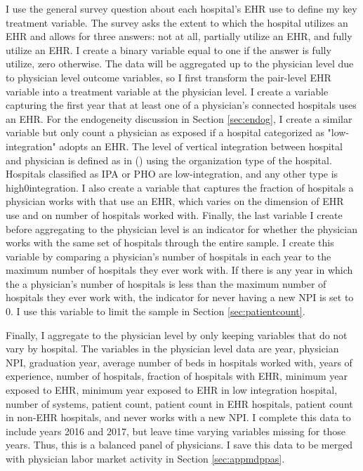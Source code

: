 \documentclass[12pt]{article}
\begin{document}
I use the general survey question about each hospital's EHR use to define my key treatment variable. The survey asks the extent to which the hospital utilizes an EHR and allows for three answers: not at all, partially utilize an EHR, and fully utilize an EHR. I create a binary variable equal to one if the answer is fully utilize, zero otherwise. The data will be aggregated up to the physician level due to physician level outcome variables, so I first transform the pair-level EHR variable into a treatment variable at the physician level. I create a variable capturing the first year that at least one of a physician's connected hospitals uses an EHR. For the endogeneity discussion in Section \ref{sec:endog}, I create a similar variable but only count a physician as exposed if a hospital categorized as "low-integration" adopts an EHR. The level of vertical integration between hospital and physician is defined as in \citeauthor{dynan1998assessing} (\citeyear{dynan1998assessing}) using the organization type of the hospital. Hospitals classified as IPA or PHO are low-integration, and any other type is high0integration. I also create a variable that captures the fraction of hospitals a physician works with that use an EHR, which varies on the dimension of EHR use and on number of hospitals worked with. Finally, the last variable I create before aggregating to the physician level is an indicator for whether the physician works with the same set of hospitals through the entire sample. I create this variable by comparing a physician's number of hospitals in each year to the maximum number of hospitals they ever work with. If there is any year in which the a physician's number of hospitals is less than the maximum number of hospitals they ever work with, the indicator for never having a new NPI is set to 0. I use this variable to limit the sample in Section \ref{sec:patientcount}. 

Finally, I aggregate to the physician level by only keeping variables that do not vary by hospital. The variables in the physician level data are year, physician NPI, graduation year, average number of beds in hospitals worked with, years of experience, number of hospitals, fraction of hospitals with EHR, minimum year exposed to EHR, minimum year exposed to EHR in low integration hospital, number of systems, patient count, patient count in EHR hospitals, patient count in non-EHR hospitals, and never works with a new NPI. I complete this data to include years 2016 and 2017, but leave time varying variables missing for those years. Thus, this is a balanced panel of physicians. I save this data to be merged with physician labor market activity in Section \ref{sec:appmdppas}.
\end{document}
